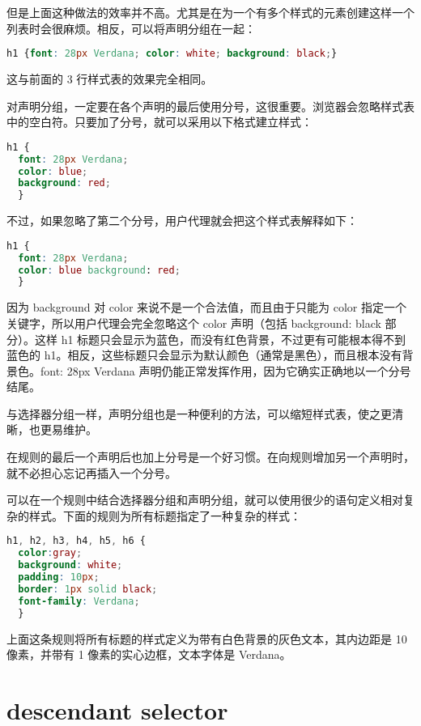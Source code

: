 但是上面这种做法的效率并不高。尤其是在为一个有多个样式的元素创建这样一个列表时会很麻烦。相反，可以将声明分组在一起：

\begin{lstlisting}[language=CSS]
h1 {font: 28px Verdana; color: white; background: black;}
\end{lstlisting}


这与前面的 3 行样式表的效果完全相同。

对声明分组，一定要在各个声明的最后使用分号，这很重要。浏览器会忽略样式表中的空白符。只要加了分号，就可以采用以下格式建立样式：

\begin{lstlisting}[language=CSS]
h1 {
  font: 28px Verdana;
  color: blue;
  background: red;
  }
\end{lstlisting}

不过，如果忽略了第二个分号，用户代理就会把这个样式表解释如下：

\begin{lstlisting}[language=CSS]
h1 {
  font: 28px Verdana;
  color: blue background: red;
  }
\end{lstlisting}


因为 background 对 color 来说不是一个合法值，而且由于只能为 color 指定一个关键字，所以用户代理会完全忽略这个 color 声明（包括 background: black 部分）。这样 h1 标题只会显示为蓝色，而没有红色背景，不过更有可能根本得不到蓝色的 h1。相反，这些标题只会显示为默认颜色（通常是黑色），而且根本没有背景色。font: 28px Verdana 声明仍能正常发挥作用，因为它确实正确地以一个分号结尾。

与选择器分组一样，声明分组也是一种便利的方法，可以缩短样式表，使之更清晰，也更易维护。


在规则的最后一个声明后也加上分号是一个好习惯。在向规则增加另一个声明时，就不必担心忘记再插入一个分号。

可以在一个规则中结合选择器分组和声明分组，就可以使用很少的语句定义相对复杂的样式。下面的规则为所有标题指定了一种复杂的样式：


\begin{lstlisting}[language=CSS]
h1, h2, h3, h4, h5, h6 {
  color:gray;
  background: white;
  padding: 10px;
  border: 1px solid black;
  font-family: Verdana;
  }
\end{lstlisting}



上面这条规则将所有标题的样式定义为带有白色背景的灰色文本，其内边距是 10 像素，并带有 1 像素的实心边框，文本字体是 Verdana。

\section{descendant selector}



